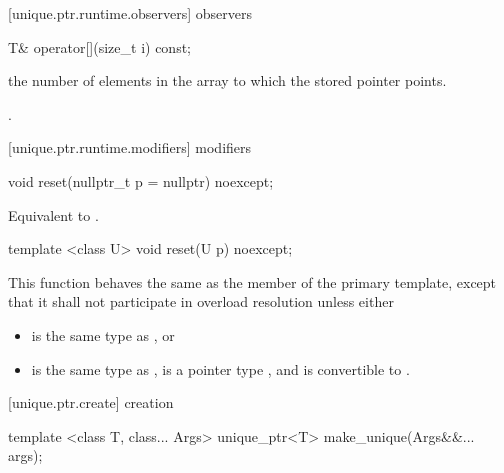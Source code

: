 [unique.ptr.runtime.observers]{ observers}

%
\begin{itemdecl}
T& operator[](size_t i) const;
\end{itemdecl}

\begin{itemdescr}
\pnum
\requires {} the
number of elements in the array to which
the stored pointer points.

\pnum
\returns {}.
\end{itemdescr}

[unique.ptr.runtime.modifiers]{ modifiers}

%
\begin{itemdecl}
void reset(nullptr_t p = nullptr) noexcept;
\end{itemdecl}

\begin{itemdescr}
\pnum
\effects Equivalent to .
\end{itemdescr}

%
\begin{itemdecl}
template <class U> void reset(U p) noexcept;
\end{itemdecl}

\begin{itemdescr}
\pnum
This function behaves the same as
the  member of the primary template,
except that it shall not participate in overload resolution
unless either

\begin{itemize}
\item {} is the same type as , or
\item {} is the same type as ,
       is a pointer type , and
       is convertible to .
\end{itemize}
\end{itemdescr}

[unique.ptr.create]{ creation}

%
\begin{itemdecl}
template <class T, class... Args> unique_ptr<T> make_unique(Args&&... args);
\end{itemdecl}

